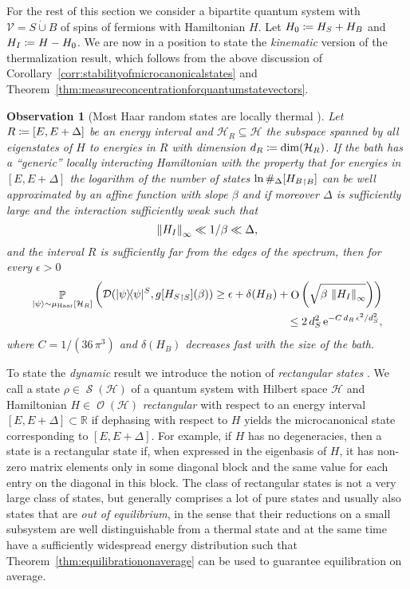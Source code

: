 \documentclass[a4paper,12pt,listof=totoc,index=totoc,bibliography=totoc,headsepline=false,headings=normal,BCOR16.153846mm,DIV12,headinclude,twoside,cleardoublepage=empty,numbers=noenddot,final]{scrreprt}
\theoremstyle{mystyle}
\numberwithin{equation}{section}
\numberwithin{figure}{section}
\numberwithin{lemma}{section}
\numberwithin{theorem}{section}
\numberwithin{corollary}{section}
\numberwithin{definition}{section}
\numberwithin{conjecture}{section}
\newtheorem{observation}{Observation}
\numberwithin{observation}{section}
\newcommand{\+}{\mkern2mu}
\newcommand{\coloneqq}{\mathrel{\vcentcolon\mkern-1.2mu=}} %
\newcommand{\dunion}{\mathbin{\dot{\cup}}}
\renewcommand{\H}{H}
\newcommand{\rhog}{g}
\newcommand{\muhaar}{\mu_{\mathrm{Haar}}}
\newcommand{\Vset}{\mathcal{V}}
\newcommand{\bra}[1]{\langle #1|}
\newcommand{\ket}[1]{|#1\rangle}
\newcommand{\ketbra}[2]{\ket{#1}\!\bra{#2}}
\newcommand{\norm}[2][]{
  \ifthenelse{\equal{#1}{}}
    {\left\| {#2} \right\|}
    {\ifthenelse{\equal{#1}{uinv}}
      {\left\vert\kern-0.25ex\left\vert\kern-0.25ex\left\vert {#2} \right\vert\kern-0.25ex\right\vert\kern-0.25ex\right\vert}
      {\left\| {#2} \right\|_{#1}}
    }
}
\newcommand{\tracedistance}[3][]{
  \ifthenelse{\equal{#2}{}}
  {\ifthenelse{\equal{#3}{}}
    {\mathcal{D}_{#1}}{}
  }{
    \ifthenelse{\equal{#1}{}}
    {\operatorname{\mathcal{D}}(#2,#3)}
    {\operatorname{\mathcal{D}}_{#1}(#2,#3)}
  }
}
\DeclareMathOperator{\landauO}{O}
\DeclareMathOperator*{\probability}{\mathbb{P}}
\newcommand{\trunc}[2]{{#1}_{\upharpoonright \mathnormal{#2}}}
\newcommand{\e}{\mathrm{e}}
\DeclareMathOperator{\1}{\mathds{1}}
\DeclareMathOperator{\Obs}{\mathcal{O}}
\DeclareMathOperator{\Qst}{\mathcal{S}}
\newcommand{\mc}[1]{\mathcal{#1}}
\newcommand{\mcH}{\mc{H}}
\newcommand{\mb}[1]{\mathbb{#1}}
\newcommand{\R}{\mb{R}}
\begin{document}
For the rest of this section we consider a bipartite quantum system with $\Vset = S \dunion B$ of spins of fermions with Hamiltonian $\H$.
Let $\H_0 \coloneqq \H_S + \H_B$ and $\H_I \coloneqq \H - \H_0$.
We are now in a position to state the \emph{kinematic} version of the thermalization result, which follows from the above discussion of Corollary~\ref{corr:stabilityofmicrocanonicalstates} and Theorem~\ref{thm:measureconcentrationforquantumstatevectors}.
\begin{observation}[Most Haar random states are locally thermal \cite{Riera2012}] \label{obs:thermalizationonofrandomstaates}
  Let $R \coloneqq [E,E+\Delta]$ be an energy interval and $\mcH_R \subseteq \mcH$ the subspace spanned by all eigenstates of $\H$ to energies in $R$ with dimension $d_R \coloneqq \dim(\mcH_R)$.
  If the bath has a ``generic'' locally interacting Hamiltonian with the property that for energies in $[E,E+\Delta]$ the logarithm of the number of states $\ln \#_\Delta[\trunc{\H_B}B]$ can be well approximated by an affine function with slope $\beta$ and if moreover $\Delta$ is sufficiently large and the interaction sufficiently weak such that
  \begin{equation}
    \norm[\infty]{\H_I} \ll 1/\beta \ll \Delta ,
  \end{equation}
  and the interval $R$ is sufficiently far from the edges of the spectrum, then for every $\epsilon > 0$
  \begin{equation} \label{eq:proababilityofrandomstatebeeingnotthermal}
    \begin{split}
      \probability_{\ket\psi\sim\muhaar[\mcH_R]}\left(\tracedistance{\ketbra\psi\psi^S}{\rhog[\trunc{\H_S}S](\beta)} \geq \epsilon + \delta(\H_B) + \landauO\left(\sqrt{\beta\,\norm[\infty]{H_I}}\right) \right)\\
      \leq 2\,d_S^2\,\e^{-C\,d_R\,{\epsilon}^2/d_S^2} ,
    \end{split}
  \end{equation}
  where $C = 1/(36\,\pi^3)$ and $\delta(\H_B)$ decreases fast with the size of the bath.
\end{observation}

To state the \emph{dynamic} result we introduce the notion of \emph{rectangular states} \cite{Riera2012}.
We call a state $\rho \in \Qst(\mcH)$ of a quantum system with Hilbert space $\mcH$ and Hamiltonian $\H \in \Obs(\mcH)$ \emph{rectangular} with respect to an energy interval $[E,E+\Delta] \subset \R$ if dephasing with respect to $\H$ yields the microcanonical state corresponding to $[E,E+\Delta]$.
For example, if $\H$ has no degeneracies, then a state is a rectangular state if, when expressed in the eigenbasis of $\H$, it has non-zero matrix elements only in some diagonal block and the same value for each entry on the diagonal in this block.
The class of rectangular states is not a very large class of states, but generally comprises a lot of pure states and usually also states that are \emph{out of equilibrium}, in the sense that their reductions on a small subsystem are well distinguishable from a thermal state and at the same time have a sufficiently widespread energy distribution such that Theorem~\ref{thm:equilibrationonaverage} can be used to guarantee equilibration on average.
\end{document}
